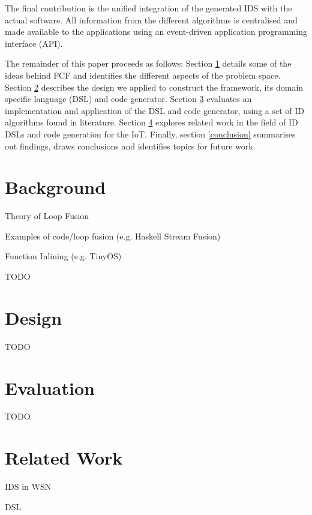 \documentclass[conference]{IEEEtran}
\begin{document}
The final contribution is the unified integration of the generated IDS with the
actual software. All information from the different algorithms is centralised
and made available to the applications using an event-driven application
programming interface (API).

The remainder of this paper proceeds as follows: Section \ref{background}
details some of the ideas behind FCF and identifies the different aspects of
the problem space. Section \ref{design} describes the design we applied to
construct the framework, its domain specific language (DSL) and code generator.
Section \ref{evaluation} evaluates an implementation and application of the DSL
and code generator, using a set of ID algorithms found in literature. Section
\ref{related} explores related work in the field of ID DSLs and code generation
for the IoT. Finally, section \ref{conclusion} summarises out findings, draws
conclusions and identifies topics for future work.

\section{Background}
\label{background}

Theory of Loop Fusion \cite{darte2000complexity}

Examples of code/loop fusion (e.g. Haskell Stream Fusion) \cite{coutts2007stream}

Function Inlining (e.g. TinyOS) \cite{gay2007software,gay2003nesc}

TODO

\section{Design}
\label{design}

TODO

\section{Evaluation}
\label{evaluation}

TODO

\section{Related Work}
\label{related}

IDS in WSN \cite{perrig2004security,mishra2004intrusion}

DSL \cite{fowler2010domain,mernik2005and}
\end{document}
